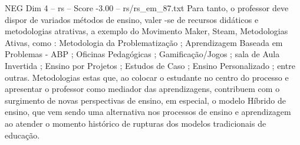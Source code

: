 \begin{textsample}{NEG Dim 4 – rs – Score -3.00 – rs/rs\_em\_87.txt}
Para tanto, o professor deve dispor de variados métodos de ensino, valer -se de recursos didáticos e metodologias atrativas, a exemplo do Movimento Maker, Steam, Metodologias Ativas, como : Metodologia da Problematização ; Aprendizagem Baseada em Problemas - ABP ; Oficinas Pedagógicas ; Gamificação/Jogos ; sala de Aula Invertida ; Ensino por Projetos ; Estudos de Caso ; Ensino Personalizado ; entre outras.
Metodologias estas que, ao colocar o estudante no centro do processo e apresentar o professor como mediador das aprendizagens, contribuem com o surgimento de novas perspectivas de ensino, em especial, o modelo Híbrido de ensino, que vem sendo uma alternativa nos processos de ensino e aprendizagem ao atender o momento histórico de rupturas dos modelos tradicionais de educação.

\end{textsample}
